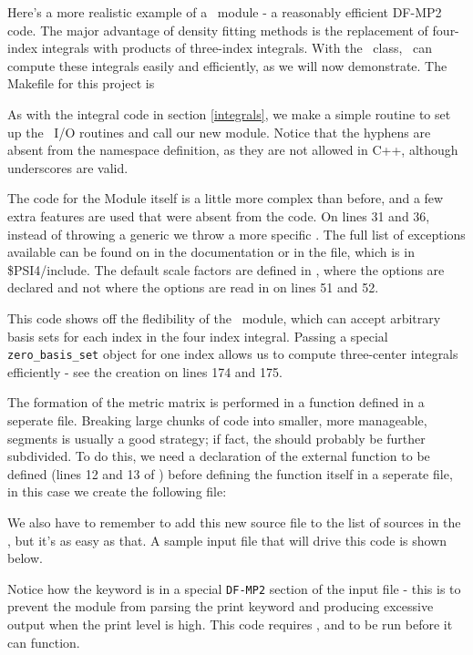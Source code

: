Here's a more realistic example of a \PSIfour\ module - a reasonably efficient
DF-MP2 code.  The major advantage of density fitting methods is the replacement
of four-index integrals with products of three-index integrals.  With the
\libmints\ class, \PSIfour\ can compute these integrals easily and efficiently,
as we will now demonstrate.  The Makefile for this project is


As with the integral code in section \ref{integrals}, we make a simple
 routine to set up the \PSI\ I/O routines and call our new module.
Notice that the hyphens are absent from the namespace definition, as they are
not allowed in C++, although underscores are valid.


The code for the Module itself is a little more complex than before, and a few
extra features are used that were absent from the  code.  On
lines 31 and 36, instead of throwing a generic  we throw a
more specific .  The full list of exceptions available
can be found on in the  documentation or in the
 file, which is in \$PSI4/include.  The default scale
factors are defined in , where the options are declared and not
where the options are read in on lines 51 and 52.

This code shows off the fledibility of the \libmints\ module, which can accept
arbitrary basis sets for each index in the four index integral.  Passing a
special {\tt zero\_basis\_set} object for one index allows us to compute
three-center integrals efficiently - see the  creation
on lines 174 and 175.  


The formation of the metric matrix is performed in a function defined in a
seperate file.  Breaking large chunks of code into smaller, more manageable,
segments is usually a good strategy; if fact, the  should
probably be further subdivided.  To do this, we need a declaration of the
external function to be defined (lines 12 and 13 of ) before
defining the function itself in a seperate file, in this case we create the
following file:


We also have to remember to add this new source file to the list of sources in
the , but it's as easy as that.  A sample input file that will
drive this code is shown below.


Notice how the  keyword is in a special {\tt DF-MP2} section of
the input file - this is to prevent the  module from parsing the
print keyword and producing excessive output when the print level is high.
This code requires ,  and  to be run
before it can function.
